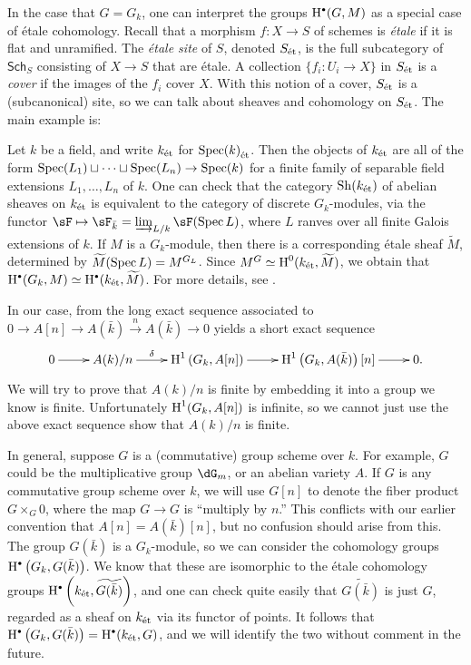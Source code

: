 In the case that $G=G_k$, one can interpret the groups $\h^\bullet(G,M)$ as a 
special case of \'etale cohomology. Recall that a morphism $f:X\to S$ of 
schemes is \emph{\'etale} if it is flat and unramified. The \emph{\'etale 
site} of $S$, denoted ${S}_\textnormal{\'et}$, is the full subcategory of $\mathsf{Sch}_S$ 
consisting of $X\to S$ that are \'etale. A collection $\{f_i:U_i\to X\}$ in 
${S}_\textnormal{\'et}$ is a \emph{cover} if the images of the $f_i$ cover $X$. With this 
notion of a cover, ${S}_\textnormal{\'et}$ is a (subcanonical) site, so we can talk about 
sheaves and cohomology on ${S}_\textnormal{\'et}$. The main example is: 

\begin{example}
Let $k$ be a field, and write ${k}_\textnormal{\'et}$ for ${\operatorname{Spec}(k)}_\textnormal{\'et}$. Then the objects of 
${k}_\textnormal{\'et}$ are all 
of the form $\operatorname{Spec}(L_1)\sqcup \cdots \sqcup \operatorname{Spec}(L_n)\to \operatorname{Spec}(k)$ for a 
finite family of separable field extensions $L_1,\dots,L_n$ of $k$. One can 
check that the category $\operatorname{Sh}({k}_\textnormal{\'et})$ of abelian sheaves on ${k}_\textnormal{\'et}$ is 
equivalent to the category of discrete $G_k$-modules, via the functor 
$\sF\mapsto \sF_{\bar k} = \varinjlim_{L/k} \sF(\spec L)$, where $L$ ranves 
over all finite Galois extensions of $k$. If $M$ is a $G_k$-module, then there 
is a corresponding \'etale sheaf $\widetilde M$, determined by 
$\widetilde M(\operatorname{Spec} L) = M^{G_L}$. Since 
$M^G\simeq \operatorname{H}^0({k}_\textnormal{\'et},\widetilde M)$, we obtain that 
$\h^\bullet(G_k,M) \simeq \h^\bullet(\et k, \widetilde M)$. For more details, 
see \cite[I 2.4]{de77}. 
\end{example}

In our case, from the long exact sequence associated to 
$0\to A[n]\to A(\bar k) \xrightarrow n A(\bar k) \to 0$ yields a short 
exact sequence 
\[\xymatrix{
  0 \ar[r] 
    & A(k) / n \ar[r]^-\delta
    & \h^1\left(G_k,A[n]\right) \ar[r] 
    & \h^1\left(G_k,A(\bar k)\right)[n] \ar[r]
    & 0 \text{.}
}\]
We will try to prove that $A(k)/ n$ is finite by embedding it into a group 
we know is finite. Unfortunately $\operatorname{H}^1(G_k, A[n])$ is infinite, so we cannot 
just use the above exact sequence show that $A(k)/n$ is finite. 

In general, suppose $G$ is a (commutative) group scheme over $k$. For example, 
$G$ could be the multiplicative group $\dG_m$, or an abelian variety $A$. If 
$G$ is any commutative group scheme over $k$, we will use $G[n]$ to denote the 
fiber product $G\times_G 0$, where the map $G\to G$ is ``multiply by $n$.'' 
This conflicts with our earlier convention that $A[n]=A(\bar k)[n]$, but 
no confusion should arise from this. The group $G(\bar k)$ is 
a $G_k$-module, so we can consider the cohomology groups 
$\h^\bullet\left(G_k, G(\bar k)\right)$. We know that these are isomorphic to 
the \'etale cohomology groups 
$\h^\bullet\left(\et k, \widetilde{G(\bar k)}\right)$, and one can check quite 
easily that $\widetilde{G(\bar k)}$ is just $G$, regarded as a sheaf on ${k}_\textnormal{\'et}$ 
via its functor of points. It follows that 
$\h^\bullet\left(G_k, G(\bar k)\right) = \h^\bullet(\et k, G)$, and we will 
identify the two without comment in the future. 

